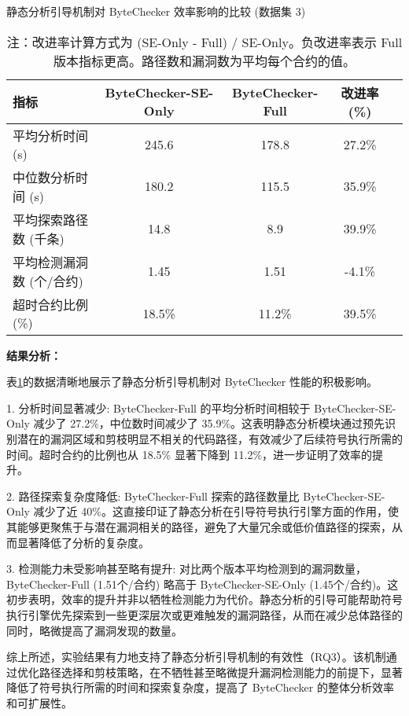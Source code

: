 \documentclass[print, master, vlined, timesmath]{DissertUESTC}
\begin{document}
    
\begin{table}[H]
    \centering
    \caption{静态分析引导机制对 ByteChecker 效率影响的比较 (数据集 3)}
    \begin{tabular}{lcccr}
        \toprule
        \textbf{指标} & \textbf{ByteChecker-SE-Only} & \textbf{ByteChecker-Full} & \textbf{改进率 (\%)} \\
        \midrule
        平均分析时间 (s) & 245.6 & 178.8 & 27.2\% \\
        中位数分析时间 (s) & 180.2 & 115.5 & 35.9\% \\
        平均探索路径数 (千条) & 14.8 & 8.9 & 39.9\% \\
        平均检测漏洞数 (个/合约) & 1.45 & 1.51 & -4.1\% \\
        超时合约比例 (\%) & 18.5\% & 11.2\% & 39.5\% \\
        \bottomrule
    \end{tabular}
    \caption*{注：改进率计算方式为 (SE-Only - Full) / SE-Only。负改进率表示 Full 版本指标更高。路径数和漏洞数为平均每个合约的值。}
    \label{tab:static_guidance_comparison}
\end{table}

\textbf{结果分析：}
    
表\ref{tab:static_guidance_comparison}的数据清晰地展示了静态分析引导机制对 ByteChecker 性能的积极影响。

1. 分析时间显著减少: ByteChecker-Full 的平均分析时间相较于 ByteChecker-SE-Only 减少了 27.2\%，中位数时间减少了 35.9\%。这表明静态分析模块通过预先识别潜在的漏洞区域和剪枝明显不相关的代码路径，有效减少了后续符号执行所需的时间。超时合约的比例也从 18.5\% 显著下降到 11.2\%，进一步证明了效率的提升。

2. 路径探索复杂度降低: ByteChecker-Full 探索的路径数量比 ByteChecker-SE-Only 减少了近 40\%。这直接印证了静态分析在引导符号执行引擎方面的作用，使其能够更聚焦于与潜在漏洞相关的路径，避免了大量冗余或低价值路径的探索，从而显著降低了分析的复杂度。

3. 检测能力未受影响甚至略有提升: 对比两个版本平均检测到的漏洞数量，ByteChecker-Full (1.51个/合约) 略高于 ByteChecker-SE-Only (1.45个/合约)。这初步表明，效率的提升并非以牺牲检测能力为代价。静态分析的引导可能帮助符号执行引擎优先探索到一些更深层次或更难触发的漏洞路径，从而在减少总体路径的同时，略微提高了漏洞发现的数量。

综上所述，实验结果有力地支持了静态分析引导机制的有效性（RQ3）。该机制通过优化路径选择和剪枝策略，在不牺牲甚至略微提升漏洞检测能力的前提下，显著降低了符号执行所需的时间和探索复杂度，提高了 ByteChecker 的整体分析效率和可扩展性。
    
\end{document}
